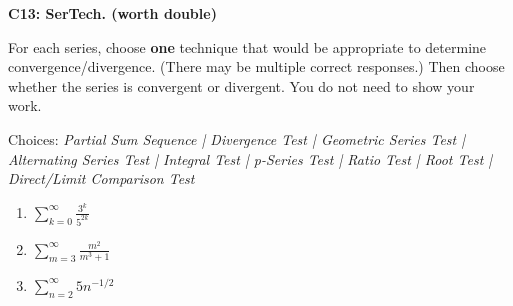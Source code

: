 \documentclass[12pt]{article}
\newcommand{\<}{\left\langle}
\renewcommand{\>}{\right\rangle}
\newcommand{\exerciseHeader}[4]{


  \vspace{0.5em}
  \textbf{#2}
  \vspace{0.5em}

}
\begin{document}
\begin{multicols}{2}
%
%
%

\exerciseHeader{2017 July 21}{C13: SerTech. (worth double)}{
Identify series as convergent or divergent along with appropriate techniques to
determine convergence or divergence.
}{4/4}

For each series, choose \textbf{one} technique that
would be appropriate to determine convergence/divergence. (There may be
multiple correct responses.) Then choose
whether the series is convergent or divergent. You do not need to show your
work.

Choices: \textit{Partial Sum Sequence |
 Divergence Test |
 Geometric Series Test |
 Alternating Series Test |
 Integral Test |
 p-Series Test |
 Ratio Test |
 Root Test |
 Direct/Limit Comparison Test}

\begin{enumerate}
  \item \(\sum_{k=0}^\infty\frac{3^k}{5^{2k}}\)
  \item \(\sum_{m=3}^\infty\frac{m^2}{m^3+1}\)
  \item \(\sum_{n=2}^\infty 5n^{-1/2}\)
\end{enumerate}



%


\end{multicols}
\end{document}
